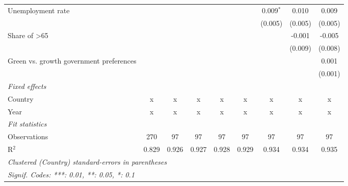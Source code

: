 \begin{table}[htbp]
\begin{tabular}{lcccccccc}
      Unemployment rate                            &         &         &             &             &         & 0.009$^{*}$ & 0.010   & 0.009\\   
                                                   &         &         &             &             &         & (0.005)     & (0.005) & (0.005)\\   
      Share of >65                                 &         &         &             &             &         &             & -0.001  & -0.005\\   
                                                   &         &         &             &             &         &             & (0.009) & (0.008)\\   
      Green vs. growth government preferences      &         &         &             &             &         &             &         & 0.001\\   
                                                   &         &         &             &             &         &             &         & (0.001)\\   
      \emph{Fixed effects}\\
      Country                                      & x       & x       & x           & x           & x       & x           & x       & x\\  
      Year                                         & x       & x       & x           & x           & x       & x           & x       & x\\  
      \midrule \emph{Fit statistics}\\
      Observations                                 & 270     & 97      & 97          & 97          & 97      & 97          & 97      & 97\\  
      R$^2$                                        & 0.829   & 0.926   & 0.927       & 0.928       & 0.929   & 0.934       & 0.934   & 0.935\\  
      \midrule
      \multicolumn{9}{l}{\emph{Clustered (Country) standard-errors in parentheses}}\\
      \multicolumn{9}{l}{\emph{Signif. Codes: ***: 0.01, **: 0.05, *: 0.1}}\\
   \end{tabular}
\end{table}


